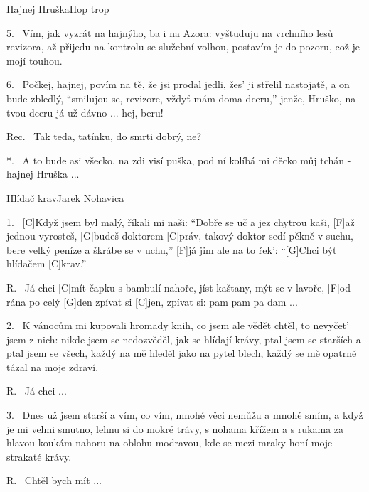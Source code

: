 \begin{song}{Hajnej Hruška}{Hop trop}
\begin{xverse}{5.~}
Vím, jak vyzrát na hajnýho, ba i na Azora:
vyštuduju na vrchního lesů revizora,
až přijedu na kontrolu se služební volhou,
postavím je do pozoru, což je mojí touhou.
\end{xverse}

\begin{xverse}{6.~}
Počkej, hajnej, povím na tě, že jsi prodal jedli,
žes' ji střelil nastojatě, a on bude zbledlý,
``smilujou se, revizore, vždyť mám doma dceru,''
jenže, Hruško, na tvou dceru já už dávno ... hej, beru!
\end{xverse}

\begin{xverse}{Rec.~}
Tak teda, tatínku, do smrti dobrý, ne?
\end{xverse}

\begin{xverse}{*.~}
A to bude asi všecko, na zdi visí puška,
pod ní kolíbá mi děcko můj tchán - hajnej Hruška ...
\end{xverse}

\end{song}

\begin{song}{Hlídač krav}{Jarek Nohavica}

\begin{xverse}{1.~}
[C]Když jsem byl malý, říkali mi naši:
``Dobře se uč a jez chytrou kaši,
[F]až jednou vyrosteš, [G]budeš doktorem [C]práv,
takový doktor sedí pěkně v suchu,
bere velký peníze a škrábe se v uchu,''
[F]já jim ale na to řek': ``[G]Chci být hlídačem [C]krav.''
\end{xverse}

\begin{xverse}{R.~}
Já chci [C]mít čapku s bambulí nahoře,
jíst kaštany, mýt se v lavoře,
[F]od rána po celý [G]den zpívat si [C]jen,
zpívat si: pam pam pa dam ...
\end{xverse}

\begin{xverse}{2.~}
K vánocům mi kupovali hromady knih,
co jsem ale vědět chtěl, to nevyčet' jsem z nich:
nikde jsem se nedozvěděl, jak se hlídají krávy,
ptal jsem se starších a ptal jsem se všech,
každý na mě hleděl jako na pytel blech,
každý se mě opatrně tázal na moje zdraví.
\end{xverse}

\begin{xverse}{R.~}
Já chci ...
\end{xverse}

\begin{xverse}{3.~}
Dnes už jsem starší a vím, co vím,
mnohé věci nemůžu a mnohé smím,
a když je mi velmi smutno, lehnu si do mokré trávy,
s nohama křížem a s rukama za hlavou
koukám nahoru na oblohu modravou,
kde se mezi mraky honí moje strakaté krávy.
\end{xverse}

\begin{xverse}{R.~}
Chtěl bych mít ...
\end{xverse}

\end{song}

